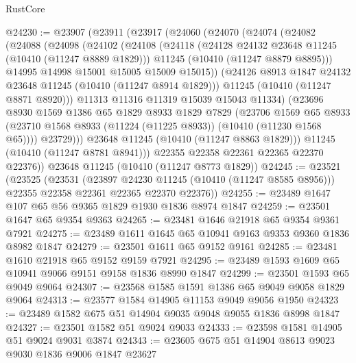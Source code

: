 \begin{lexlean}{RustCore}
\begin{coremodule}
@24230 := @23907
    (@23911
      (@23917
        (@24060
          (@24070
            (@24074
              (@24082
                (@24088
                  (@24098
                    (@24102
                      (@24108
                        (@24118
                          (@24128 @24132 @23648 @11245 (@10410 (@11247 @8889 @1829)))
                          @11245
                          (@10410 (@11247 @8879 @8895)))
                        @14995
                        @14998
                        @15001
                        @15005
                        @15009
                        @15015))
                    (@24126 @8913 @1847 @24132 @23648 @11245 (@10410 (@11247 @8914 @1829)))
                    @11245
                    (@10410 (@11247 @8871 @8920)))
                  @11313
                  @11316
                  @11319
                  @15039
                  @15043
                  @11334)
                (@23696
                  @8930
                  @1569
                  @1386
                  @65
                  @1829
                  @8933
                  @1829
                  @7829
                  (@23706
                    @1569
                    @65
                    @8933
                    (@23710 @1568 @8933 (@11224 (@11225 @8933)) (@10410 (@11230 @1568 @65))))
                  @23729)))
            @23648
            @11245
            (@10410 (@11247 @8863 @1829)))
          @11245
          (@10410 (@11247 @8781 @8941)))
        @22355
        @22358
        @22361
        @22365
        @22370
        @22376))
    @23648
    @11245
    (@10410 (@11247 @8773 @1829))
@24245 := @23521
    (@23525
      (@23531
        (@23897 @24230 @11245 (@10410 (@11247 @8585 @8956)))
        @22355
        @22358
        @22361
        @22365
        @22370
        @22376))
@24255 := @23489 @1647 @107 @65 @56 @9365 @1829 @1930 @1836 @8974 @1847
@24259 := @23501 @1647 @65 @9354 @9363
@24265 := @23481 @1646 @21918 @65 @9354 @9361 @7921
@24275 := @23489 @1611 @1645 @65 @10941 @9163 @9353 @9360 @1836 @8982 @1847
@24279 := @23501 @1611 @65 @9152 @9161
@24285 := @23481 @1610 @21918 @65 @9152 @9159 @7921
@24295 := @23489 @1593 @1609 @65 @10941 @9066 @9151 @9158 @1836 @8990 @1847
@24299 := @23501 @1593 @65 @9049 @9064
@24307 := @23568 @1585 @1591 @1386 @65 @9049 @9058 @1829 @9064
@24313 := @23577 @1584 @14905 @11153 @9049 @9056 @1950
@24323 := @23489 @1582 @675 @51 @14904 @9035 @9048 @9055 @1836 @8998 @1847
@24327 := @23501 @1582 @51 @9024 @9033
@24333 := @23598 @1581 @14905 @51 @9024 @9031 @3874
@24343 := @23605 @675 @51 @14904 @8613 @9023 @9030 @1836 @9006 @1847 @23627

\end{coremodule}
\end{lexlean}
